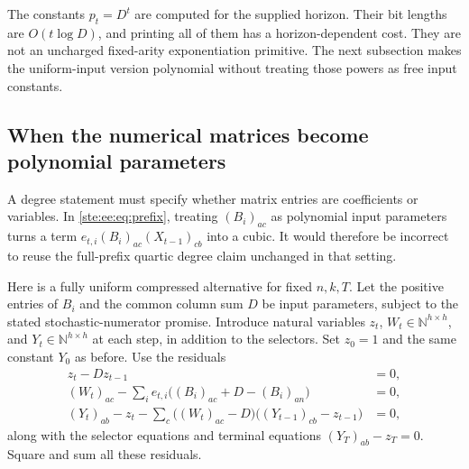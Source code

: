 \documentclass[11pt,letterpaper]{article}
\theoremstyle{definition}
\theoremstyle{remark}
\newcommand{\N}{\mathbb N}
\begin{document}
The constants $p_t=D^t$ are computed for the supplied horizon. Their bit lengths
are $O(t\log D)$, and printing all of them has a horizon-dependent cost. They
are not an uncharged fixed-arity exponentiation primitive. The next subsection
makes the uniform-input version polynomial without treating those powers as
free input constants.

\subsection{When the numerical matrices become polynomial parameters}

A degree statement must specify whether matrix entries are coefficients or
variables. In \eqref{ste:ee:eq:prefix}, treating $(B_i)_{ac}$ as polynomial input
parameters turns a term $e_{t,i}(B_i)_{ac}(X_{t-1})_{cb}$ into a cubic. It would
therefore be incorrect to reuse the full-prefix quartic degree claim unchanged
in that setting.

Here is a fully uniform compressed alternative for fixed $n,k,T$. Let the
positive entries of $B_i$ and the common column sum $D$ be input parameters,
subject to the stated stochastic-numerator promise. Introduce natural variables
$z_t$, $W_t\in\N^{h\times h}$, and $Y_t\in\N^{h\times h}$ at each step,
in addition to the selectors. Set $z_0=1$ and the same constant $Y_0$ as before.
Use the residuals
\begin{align}
 z_t-Dz_{t-1}&=0,\label{ste:ee:eq:clock}\\
 (W_t)_{ac}-\sum_i e_{t,i}\bigl((B_i)_{ac}+D-(B_i)_{an}\bigr)&=0,
 \label{ste:ee:eq:selectH}\\
 (Y_t)_{ab}-z_t-
 \sum_c\bigl((W_t)_{ac}-D\bigr)
       \bigl((Y_{t-1})_{cb}-z_{t-1}\bigr)&=0,
 \label{ste:ee:eq:uniforminfo}
\end{align}
along with the selector equations and terminal equations
$(Y_T)_{ab}-z_T=0$. Square and sum all these residuals.
\end{document}

